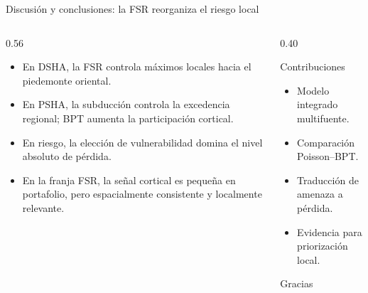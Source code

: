 \documentclass[aspectratio=169,10pt]{beamer}
\newcommand{\tightlist}{\setlength{\itemsep}{0.28em}}
\newcounter{appfig}
\newcounter{apptab}
\begin{document}
\begin{frame}[t]{Discusión y conclusiones: la FSR reorganiza el riesgo local}
\begin{columns}[T,onlytextwidth]
  \begin{column}{0.56\textwidth}
    \begin{itemize}\tightlist
      \item En DSHA, la FSR controla máximos locales hacia el piedemonte oriental.
      \item En PSHA, la subducción controla la excedencia regional; BPT aumenta la participación cortical.
      \item En riesgo, la elección de vulnerabilidad domina el nivel absoluto de pérdida.
      \item En la franja FSR, la señal cortical es pequeña en portafolio, pero espacialmente consistente y localmente relevante.
    \end{itemize}
  \end{column}
  \begin{column}{0.40\textwidth}
    \begin{block}{Contribuciones}
      \begin{itemize}\tightlist
        \item Modelo integrado multifuente.
        \item Comparación Poisson--BPT.
        \item Traducción de amenaza a pérdida.
        \item Evidencia para priorización local.
      \end{itemize}
    \end{block}
    \vspace{0.45em}
    \centering
    \Large Gracias
  \end{column}
\end{columns}
\end{frame}

\appendix
{}
\setcounter{appfig}{0}
\setcounter{apptab}{0}
\end{document}
